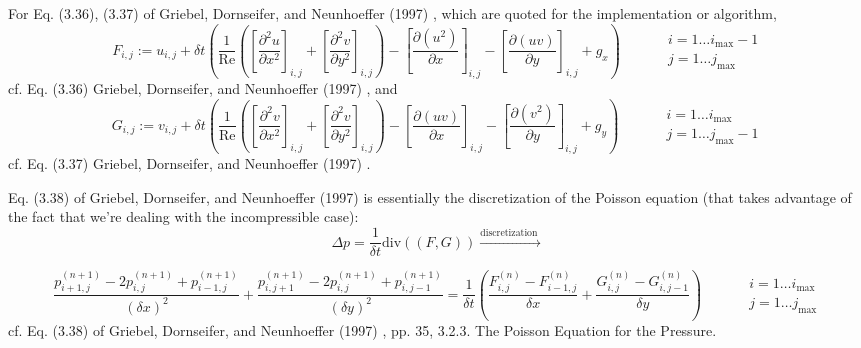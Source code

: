 \documentclass[10pt]{amsart}
\begin{document}
\begin{multicols*}{2}
For Eq. (3.36), (3.37) of Griebel, Dornseifer, and Neunhoeffer (1997) \cite{GDN1997}, which are quoted for the implementation or algorithm,
\begin{equation}
  F_{i,j} := u_{i,j} + \delta t\left( \frac{1}{ \text{Re}} \left( \left[ \frac{ \partial^2 u}{ \partial x^2} \right]_{i,j} + \left[ \frac{ \partial^2 v}{ \partial y^2 }\right]_{i,j} \right) - \left[ \frac{ \partial (u^2) }{ \partial x} \right]_{i,j} - \left[ \frac{ \partial (uv) }{ \partial y} \right]_{i,j} + g_x \right) \qquad \, \begin{aligned} & i = 1 \dots i_{\text{max}}-1  \\
    & j = 1\dots j_{\text{max}}  \end{aligned}
\end{equation}
cf. Eq. (3.36) Griebel, Dornseifer, and Neunhoeffer (1997) \cite{GDN1997}, and 
\begin{equation}
  G_{i,j} := v_{i,j} + \delta t\left( \frac{1}{ \text{Re}} \left( \left[ \frac{ \partial^2 v}{ \partial x^2} \right]_{i,j} + \left[ \frac{ \partial^2 v}{ \partial y^2 }\right]_{i,j} \right) - \left[ \frac{ \partial (uv) }{ \partial x} \right]_{i,j} - \left[ \frac{ \partial (v^2) }{ \partial y} \right]_{i,j} + g_y \right) \qquad \, \begin{aligned} & i = 1 \dots i_{\text{max}}  \\
    & j = 1\dots j_{\text{max}} - 1 \end{aligned}
\end{equation}
cf. Eq. (3.37) Griebel, Dornseifer, and Neunhoeffer (1997) \cite{GDN1997}.  

Eq. (3.38) of Griebel, Dornseifer, and Neunhoeffer (1997) \cite{GDN1997} is essentially the discretization of the Poisson equation (that takes advantage of the fact that we're dealing with the incompressible case):
\begin{equation}
  \Delta p = \frac{1}{\delta t}\text{div}((F,G)) \xrightarrow{ \text{discretization }}
  \end{equation}

\begin{equation}
  \frac{ p_{i+1,j}^{(n+1)} - 2p_{i,j}^{(n+1)} + p_{i-1,j}^{(n+1)} }{ (\delta x)^2 } +   \frac{ p_{i,j+1}^{(n+1)} - 2p_{i,j}^{(n+1)} + p_{i,j-1}^{(n+1)} }{ (\delta y)^2 } = \frac{1}{\delta t} \left( \frac{ F_{i,j}^{(n)} - F_{i-1,j}^{(n)} }{ \delta x} + \frac{ G_{i,j}^{(n)} - G_{i,j-1}^{(n)} }{\delta y} \right) \qquad \, \begin{aligned} & i = 1 \dots i_{\text{max}} \\
    & j = 1\dots j_{\text{max}} \end{aligned}
\end{equation}
cf. Eq. (3.38) of Griebel, Dornseifer, and Neunhoeffer (1997) \cite{GDN1997}, pp. 35, 3.2.3. The Poisson Equation for the Pressure.  


\end{multicols*}
\end{document}
